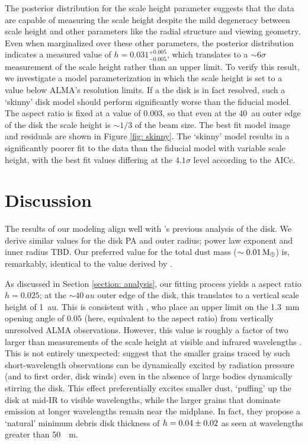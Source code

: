 \documentclass[12pt,oneside]{article}
\begin{document}
The posterior distribution for the scale height parameter suggests that the data are capable of measuring the scale height despite the mild degeneracy between scale height and other parameters like the radial structure and viewing geometry.  
Even when marginalized over these other parameters, the posterior distribution indicates a measured value of $h=0.031^{+0.005}_{-0.005}$, which translates to a $\sim 6 \sigma$ measurement of the scale height rather than an upper limit.
To verify this result, we investigate a model parameterization in which the scale height is set to a value below ALMA's resolution limits.
If a the disk is in fact resolved, such a `skinny' disk model should perform significantly worse than the fiducial model.
The aspect ratio is fixed at a value of $0.003$, so that even at the \SI{40}{au} outer edge of the disk the scale height is $\sim 1/3$ of the beam size.
The best fit model image and residuals are shown in Figure \ref{fig: skinny}.
The ‘skinny’ model results in a significantly poorer fit to the data than the fiducial model with variable scale height, with the best fit values differing at the $4.1\sigma$ level according to the AICc.


\section{Discussion}
\label{section: discussion}
The results of our modeling align well with \cite{macgregor13}'s previous analysis of the disk. We derive similar values for the disk PA and outer radius; power law exponent and inner radius TBD. Our preferred value for the total dust mass ($\sim \SI{0.01}{M_\oplus}$) is, remarkably, identical to the value derived by \cite{matthews15}.

As discussed in Section \ref{section: analysis}, our fitting process yields a aspect ratio $h = 0.025$; at the $\sim \SI{40}{au}$ outer edge of the disk, this translates to a vertical scale height of \SI{1}{au}.
This is consistent with \cite{schuppler17}, who place an upper limit on the \SI{1.3}{mm} opening angle of $0.05$ (here, equivalent to the aspect ratio) from vertically unresolved ALMA observations. 
However, this value is roughly a factor of two larger than measurements of the scale height at visible and infrared wavelengths \citep{schneider14,krist05,metchev05}. 
This is not entirely unexpected: \cite{thebault09} suggest that the smaller grains traced by such short-wavelength observations can be dynamically excited by radiation pressure (and to first order, disk winds) even in the absence of large bodies dynamically stirring the disk. 
This effect preferentially excites smaller dust, `puffing' up the disk at mid-IR to visible wavelengths, while the larger grains that dominate emission at longer wavelengths remain near the midplane.
In fact, they propose a `natural' minimum debris disk thickness of $h = \num{0.04 \pm 0.02}$ as seen at wavelengths greater than \SI{50}{\mu \meter}.
\end{document}

